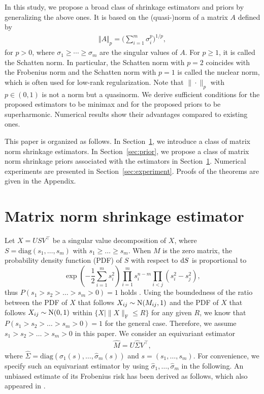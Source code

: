 \documentclass[11pt, a4paper]{article}
\theoremstyle{remark}
\begin{document}
In this study, we propose a broad class of shrinkage estimators and priors by generalizing the above ones.
It is based on the (quasi-)norm of a matrix $A$ defined by
\begin{align}
\Vert A\Vert_{p}=\Big(\sum_{i=1}^m\sigma_i^p \Big)^{1/p}, \label{schatten}
\end{align}
for $p>0$, where $\sigma_1\ge\cdots\ge\sigma_m$ are the singular values of $A$. 
For $p \geq 1$, it is called the Schatten norm.
In particular, the Schatten norm with  $p=2$ coincides with the Frobenius norm and the Schatten norm with $p=1$ is called the nuclear norm, which is often used for low-rank regularization. 
Note that $\| \cdot \|_p$ with $p\in(0,1)$ is not a norm but a quasinorm.
We derive sufficient conditions for the proposed estimators to be minimax and for the proposed priors to be superharmonic.
Numerical results show their advantages compared to existing ones.

This paper is organized as follows.
In Section~\ref{sec:est}, we introduce a class of matrix norm shrinkage estimators. 
In Section~\ref{sec:prior}, we propose a class of matrix norm shrinkage priors associated with the estimators in Section~\ref{sec:est}. 
Numerical experiments are presented in Section~\ref{sec:experiment}.
Proofs of the theorems are given in the Appendix.


\section{Matrix norm shrinkage estimator}\label{sec:est}
Let $X=USV^\top$ be a singular value decomposition of $X$, where ${S}=\mathrm{diag} (s_1,\dots,s_m)$ with $s_1 \geq \dots \geq s_m$. When $M$ is the zero matrix, the probability density function (PDF) of $S$ with respect to ${\rm d}{S}$ is proportional to 
\[ \exp\left(-\frac{1}{2}\sum_{i=1}^m s_i^2\right)\prod_{i=1}^m s_i^{n-m}\prod_{i<j}(s_i^2-s_j^2), \] thus $P(s_1>s_2>\dots>s_m>0)=1$ holds \citep{james1954normal}. Using the boundedness of the ratio between the PDF of $X$ that follows $X_{ij} \sim {\rm N} (M_{ij},1)$ and the PDF of $X$ that follows $X_{ij} \sim {\rm N} (0,1)$ within $\{X \mid \| X \|_{\mathrm{F}}\le R\}$ for any given $R$, we know that $P(s_1>s_2>\dots>s_m>0)=1$ for the general case. Therefore, we assume $s_1>s_2>\dots>s_m>0$ in this paper.
We consider an equivariant estimator
\begin{align}
\hat M=U \hat{\Sigma} V^\top, \label{equiv}
\end{align}
where $\hat{\Sigma}=\mathrm{diag} (\hat{\sigma}_1(s),\dots,\hat{\sigma}_m(s))$ and $s=(s_1,\dots,s_m)$.
For convenience, we specify such an equivariant estimator by using $\hat{\sigma}_1,\dots,\hat{\sigma}_m$ in the following.
An unbiased estimate of its Frobenius risk has been derived as follows, which also appeared in \cite{tsukuma2008admissibility,candes2013unbiased}.
\end{document}
